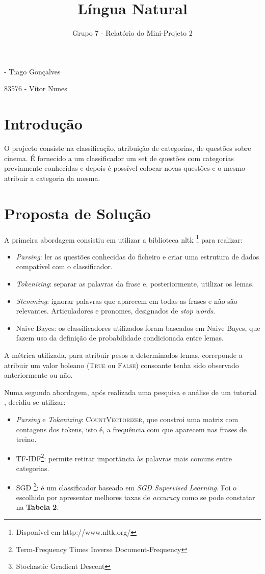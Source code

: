 \documentclass[12pt]{article}
\begin{document}
\title{\vspace{-3cm}Língua Natural}
\author{Grupo 7 - Relatório do Mini-Projeto 2}
\date{}

 - Tiago Gonçalves

83576 - Vítor Nunes

\section*{Introdução}
O projecto consiste na classificação, atribuição de categorias, de questões sobre cinema. É fornecido a um classificador um set de questões 
com categorias previamente conhecidas e depois é possível colocar novas questões e o mesmo atribuir a categoria da mesma.  

\section*{Proposta de Solução}
A primeira abordagem consistiu em utilizar a biblioteca nltk \footnote{Disponível em http://www.nltk.org/} para realizar:

\begin{itemize}
    \item{\textit{Parsing}: ler as questões conhecidas do ficheiro e criar uma estrutura de dados compatível com o classificador.}
    \item{\textit{Tokenizing}: separar as palavras da frase e, posteriormente, utilizar os lemas.}
    \item{\textit{Stemming}: ignorar palavras que aparecem em todas as frases e não são relevantes. Articuladores e pronomes, designados de \textit{stop words}.}
    \item{Naive Bayes: os classificadores utilizados foram baseados em Naive Bayes, que fazem uso da definição de probabilidade condicionada entre lemas.}
\end{itemize}

A métrica utilizada, para atribuir pesos a determinados lemas, correponde a atribuir um valor boleano (\textsc{True} ou \textsc{False}) consoante
tenha sido observado anteriormente ou não.

Numa segunda abordagem, após realizada uma pesquisa e análise de um tutorial \cite{sklearn_tutorial}, decidiu-se utilizar:

\begin{itemize}
    \item{\textit{Parsing} e \textit{Tokenizing}: \textsc{CountVectorizer}, que constroi uma matriz com contagens dos tokens, isto é, a frequência com que aparecem nas frases de treino.}
    \item{TF-IDF\footnote{Term-Frequency Times Inverse Document-Frequency}: permite retirar importância às palavras mais comuns entre categorias.}
    \item{SGD \footnote{Stochastic Gradient Descent}: é um classificador baseado em \textit{SGD Supervised Learning}. Foi o escolhido por apresentar melhores taxas de \textit{accuracy} como se pode constatar na \textbf{Tabela 2}.}
\end{itemize}
\end{document}
